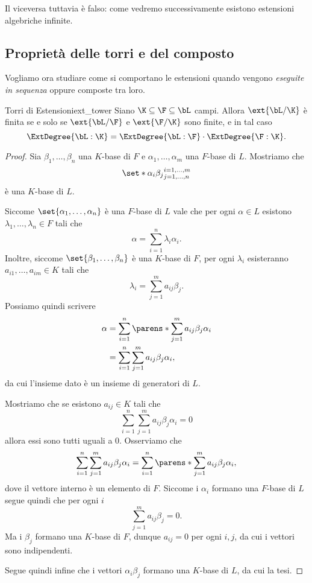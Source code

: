 Il viceversa tuttavia è falso: come vedremo successivamente esistono estensioni algebriche infinite.

\subsection{Proprietà delle torri e del composto}

Vogliamo ora studiare come si comportano le estensioni quando vengono \emph{eseguite in sequenza} oppure composte tra loro.

\begin{theorem}
    {Torri di Estensioni}{ext_tower}
    Siano $\K \subseteq \F \subseteq \bL$ campi. Allora $\ext{\bL / \K}$ è finita se e solo se $\ext{\bL / \F}$ e $\ext{\F / \K}$ sono finite, e in tal caso \[
        \ExtDegree{\bL : \K} = \ExtDegree{\bL : \F} \cdot \ExtDegree{\F : \K}.
    \]    
\end{theorem}
\begin{proof}
    Sia $\beta_1, \dots, \beta_n$ una $K$-base di $F$ e $\alpha_1, \dots, \alpha_m$ una $F$-base di $L$. Mostriamo che \[
        \set*{\alpha_i\beta_j}^{i = 1, \dots, m}_{j = 1, \dots, n}  
    \] è una $K$-base di $L$.

    Siccome $\set{\alpha_1, \dots, \alpha_n}$ è una $F$-base di $L$ vale che per ogni $\alpha \in L$ esistono $\lambda_1, \dots, \lambda_n \in F$ tali che \[
        \alpha = \sum_{i=1}^n \lambda_i\alpha_i.    
    \] Inoltre, siccome $\set{\beta_1, \dots, \beta_n}$ è una $K$-base di $F$, per ogni $\lambda_i$ esisteranno $a_{i1}, \dots, a_{im} \in K$ tali che \[
        \lambda_i = \sum_{j=1}^m a_{ij}\beta_j.    
    \] Possiamo quindi scrivere \begin{align*}
        \alpha &= \sum_{i=1}^n \parens*{\sum_{j=1}^m a_{ij}\beta_j} \alpha_i\\
        &= \sum_{i=1}^n \sum_{j=1}^m a_{ij}\beta_j\alpha_i,
    \end{align*} da cui l'insieme dato è un insieme di generatori di $L$.

    Mostriamo che se esistono $a_{ij} \in K$ tali che \[
        \sum_{i=1}^n \sum_{j=1}^m a_{ij}\beta_j\alpha_i = 0
    \] allora essi sono tutti uguali a $0$.
    Osserviamo che \[
        \sum_{i=1}^n \sum_{j=1}^m a_{ij}\beta_j\alpha_i = \sum_{i=1}^n \parens*{\sum_{j=1}^m a_{ij}\beta_j} \alpha_i,
    \] dove il vettore interno è un elemento di $F$. Siccome i $\alpha_i$ formano una $F$-base di $L$ segue quindi che per ogni $i$ \[
        \sum_{j=1}^m a_{ij}\beta_j = 0.
    \] Ma i $\beta_j$ formano una $K$-base di $F$, dunque $a_{ij} = 0$ per ogni $i, j$, da cui i vettori sono indipendenti.

    Segue quindi infine che i vettori $\alpha_i\beta_j$ formano una $K$-base di $L$, da cui la tesi.
\end{proof}

